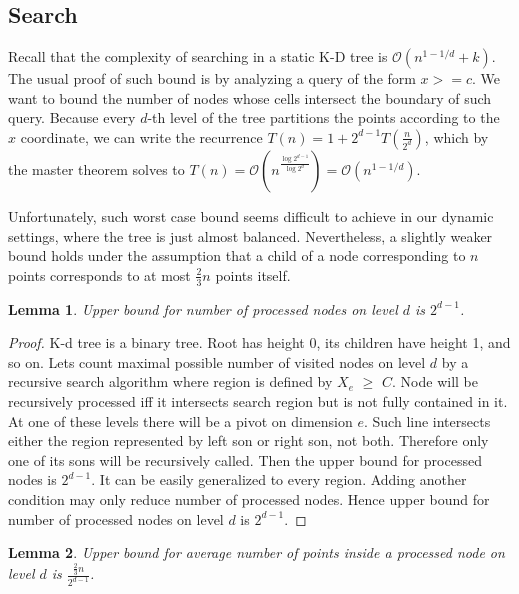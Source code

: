 \documentclass[10pt,a4paper]{article}
\newtheorem{lemma}{Lemma}
\newcommand{\Oh}{\mathcal{O}}
\begin{document}
\subsection{Search}

Recall that the complexity of searching in a static K-D tree is $\Oh(n^{1-1/d} + k)$. The usual proof of such bound is by analyzing a query of the form $x>=c$. We want to bound the number of nodes whose cells intersect the boundary of such query. Because every $d$-th level of the tree partitions the points according to the $x$ coordinate, we can write the recurrence $T(n)=1+2^{d-1}T(\frac{n}{2^{d}})$, which by the master theorem solves to $T(n)=\Oh(n^{\frac{\log 2^{d-1}}{\log 2^{d}}})=\Oh(n^{1-1/d})$. 

Unfortunately, such worst case bound seems difficult to achieve in our dynamic settings, where the tree is just almost balanced. Nevertheless, a slightly weaker bound holds under the assumption that a child of a node corresponding to $n$ points corresponds to at most $\frac{2}{3}n$ points itself.

\begin{lemma}\label{lem:3}
Upper bound for number of processed nodes on level $d$ is $2^{d-1}$.
\end{lemma}

\begin{proof}

K-d tree is a binary tree. Root has height 0, its children have height 1, and so on. Lets count maximal possible number of visited nodes on level $d$ by a recursive search algorithm where region is defined by $X_e$ $\geq$ $C$. Node will be recursively processed iff it intersects search region but is not fully contained in it. At one of these levels there will be a pivot on dimension $e$. Such line intersects either the region represented by left son or right son, not both. Therefore only one of its sons will be recursively called. Then the upper bound for processed nodes is $2^{d-1}$. It can be easily generalized to every region. Adding another condition may only reduce number of processed nodes. Hence upper bound for number of processed nodes on level $d$ is $2^{d-1}$. 

\end{proof}


\begin{lemma}\label{lem:4}
Upper bound for average number of points inside a processed node on level $d$ is $\frac{\frac{2}{3}n}{2^{d-1}}$.
\end{lemma}
\end{document}
